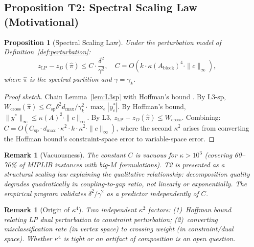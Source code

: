 \documentclass[12pt]{article}
\newtheorem{proposition}[theorem]{Proposition}
\newtheorem{remark}[theorem]{Remark}
\begin{document}
\subsection{Proposition T2: Spectral Scaling Law (Motivational)}
\label{sec:T2}

\begin{proposition}[Spectral Scaling Law]
\label{prop:T2}
Under the perturbation model of Definition~\ref{def:perturbation}:
\begin{equation}\label{eq:T2}
  z_{\mathrm{LP}} - z_D(\hat{\pi}) \leq C \cdot \frac{\delta^2}{\gamma^2},
  \quad C = O(k \cdot \kappa(A_{\mathrm{block}})^4 \cdot \|c\|_\infty),
\end{equation}
where $\hat{\pi}$ is the spectral partition and $\gamma = \gamma_k$.
\end{proposition}

\begin{proof}[Proof sketch]
Chain Lemma~\ref{lem:L3sp} with Hoffman's bound \citep{hoffman1952approximate}.
By L3-sp, $W_{\mathrm{cross}}(\hat{\pi}) \leq C_{\mathrm{sp}} \delta^2 d_{\max} / \gamma_k^2 \cdot \max_e |y_e^*|$.
By Hoffman's bound, $\|y^*\|_\infty \leq \kappa(A)^2 \cdot \|c\|_\infty$.
By L3, $z_{\mathrm{LP}} - z_D(\hat{\pi}) \leq W_{\mathrm{cross}}$.
Combining: $C = O(C_{\mathrm{sp}} \cdot d_{\max} \cdot \kappa^2 \cdot k \cdot \kappa^2 \cdot \|c\|_\infty)$,
where the second $\kappa^2$ arises from converting the Hoffman bound's
constraint-space error to variable-space error.
\end{proof}

\begin{remark}[Vacuousness]
The constant $C$ is vacuous for $\kappa > 10^3$ (covering 60--70\% of MIPLIB
instances with big-$M$ formulations).  T2 is presented as a \emph{structural
scaling law} explaining the qualitative relationship: decomposition quality
degrades \emph{quadratically} in coupling-to-gap ratio, not linearly or
exponentially.  The empirical program validates $\delta^2/\gamma^2$ as a
predictor independently of $C$.
\end{remark}

\begin{remark}[Origin of $\kappa^4$]
Two independent $\kappa^2$ factors: (1)~Hoffman bound relating LP dual
perturbation to constraint perturbation; (2)~converting misclassification rate
(in vertex space) to crossing weight (in constraint/dual space).
Whether $\kappa^4$ is tight or an artifact of composition is an open question.
\end{remark}
\end{document}

